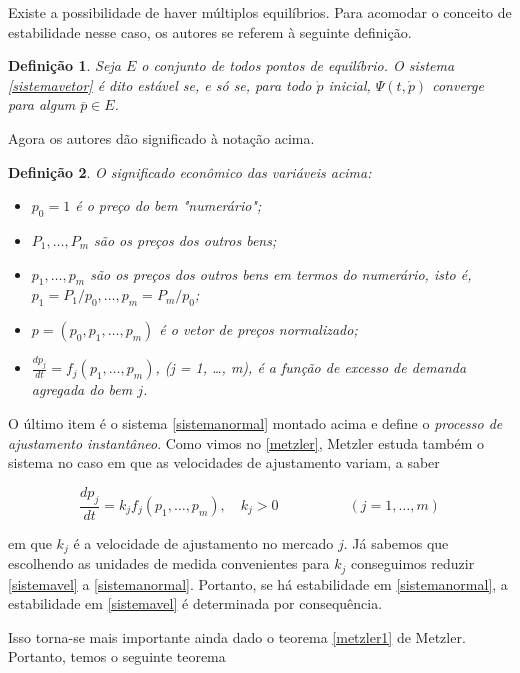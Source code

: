 \documentclass[
	12pt,				%
	openright,			%
	twoside,			%
	a4paper,			%
	english,			%
	french,				%
	spanish,			%
	brazil				%
	]{abntex2}
\newtheorem{definicao}{Definição}[chapter]
\newcommand{\espaco}{\hspace{5em}}
\newcommand{\solucao}{\Psi(t, \mathring{p})}
\newcommand{\pbola}{\mathring{p}}
\newcommand{\pbarra}{\overline{p}}
\begin{document}
Existe a possibilidade de haver múltiplos equilíbrios. Para acomodar o conceito
de estabilidade nesse caso, os autores se referem à seguinte definição.

\begin{definicao}
	Seja $E$ o conjunto de todos pontos de equilíbrio. O sistema \ref{sistemavetor}
	é dito estável se, e só se, para todo $\pbola$ inicial, $\solucao$ converge para algum
	$\pbarra \in E$.
\end{definicao}

Agora os autores dão significado à notação acima.

\begin{definicao}
	O significado econômico das variáveis acima:
	\begin{itemize}
		\item $p_0 = 1$ é o preço do bem "numerário";
		\item $P_1, \ldots, P_m$ são os preços dos outros bens;
		\item $p_1, \ldots, p_m$ são os preços dos outros bens em termos do numerário,
		isto é, $p_1 = P_1/p_0, \ldots, p_m = P_m/p_0$;
	  \item $p = (p_0, p_1, \ldots, p_m)$ é o vetor de preços normalizado;
		\item $\frac{dp_j}{dt} = f_j(p_1, \ldots, p_m)$, (j = 1, \ldots, m), é a
		função de excesso de demanda agregada do bem $j$.
	\end{itemize}
\end{definicao}

O último item é o sistema \ref{sistemanormal} montado acima e define o \textit{processo de ajustamento instantâneo}. Como vimos no \autoref{metzler},
Metzler estuda também o sistema no caso em que as velocidades de ajustamento variam, a saber

\begin{equation} \label{sistemavel}
	\frac{dp_j}{dt} = k_jf_j(p_1, \ldots, p_m), \quad k_j > 0 \espaco (j = 1, \ldots, m)
\end{equation}

em que $k_j$ é a velocidade de ajustamento no mercado $j$. Já sabemos que escolhendo
as unidades de medida convenientes para $k_j$ conseguimos reduzir \ref{sistemavel}
a \ref{sistemanormal}. Portanto, se há estabilidade em \ref{sistemanormal}, a estabilidade
em \ref{sistemavel} é determinada por consequência.

Isso torna-se mais importante ainda dado o teorema \ref{metzler1} de Metzler. %
Portanto, temos o seguinte teorema
\end{document}
